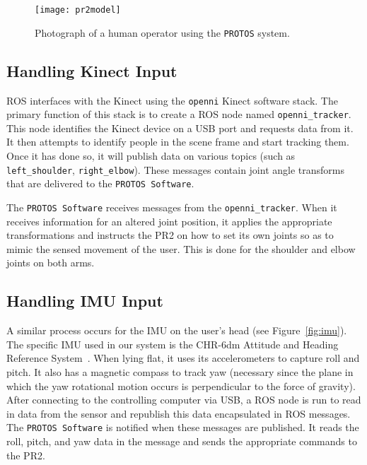\documentclass{sig-alternate}
\begin{document}
\begin{figure}[htb] 
	\begin{center}
		\texttt{[image: pr2model]}
	\end{center}
	\caption{Photograph of a human operator using the {\tt PROTOS} system.}
	\label{fig:human_model}
\end{figure}

\subsection{Handling Kinect Input}
\indent ROS interfaces with the Kinect using the {\tt openni} Kinect software stack. The primary
function of this stack is to create a ROS node named {\tt openni\_tracker}. This
node identifies the Kinect device on a USB port and requests data
from it. It then attempts to identify people in the scene frame and start
tracking them. Once it has done so, it will publish data on various
topics (such as {\tt left\_shoulder}, {\tt right\_elbow}). These messages
contain joint angle transforms that are delivered to the {\tt PROTOS Software}.

\indent The {\tt PROTOS Software} receives messages from the
 {\tt openni\_tracker}.
When it receives information for an altered joint position, it applies the
appropriate transformations and instructs the PR2 on how to set its own joints
so as to mimic the sensed movement of the user. This is done for the shoulder
and elbow joints on both arms.

\subsection{Handling IMU Input}
\indent A similar process occurs for the IMU on the user's head (see Figure~\ref{fig:imu}). The specific IMU used in our system is
the CHR-6dm Attitude and Heading Reference System~\cite{imu_chr}. When lying flat, it uses its
accelerometers to capture roll and pitch. It also has a magnetic compass to 
track yaw (necessary since the plane in which the yaw rotational motion occurs
is perpendicular to the force of gravity). After connecting to the 
controlling computer via USB, a ROS node is run to read in data from the sensor and republish this data
encapsulated in ROS messages. The {\tt PROTOS Software} is notified when these
messages are published. It reads the roll, pitch, and yaw data in the message
and sends the appropriate commands to the PR2.
\end{document}
